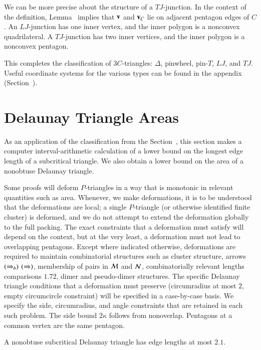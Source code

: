 We can be more precise about the structure of a $TJ$-junction.  In the
context of the definition, Lemma~ implies that ${\mathbf v}$
and ${\mathbf v}_C$ lie on adjacent pentagon edges of $C$.  An $LJ$-junction
has one inner vertex, and the inner polygon is a nonconvex quadrilateral.
A $TJ$-junction has two inner vertices, and the inner polygon is a
nonconvex pentagon.

This completes the classification of $3C$-triangles: $\Delta$,
pinwheel, pin-$T$, $LJ$, and $TJ$.  Useful coordinate systems for the
various types can be found in the appendix
(Section~).

\section{Delaunay Triangle Areas}

As an application of the classification from the
Section~, this section makes a computer interval-arithmetic
calculation of a lower bound on the longest edge length of a
subcritical triangle.  We also obtain a lower bound on the area of a
nonobtuse Delaunay triangle.

Some proofs will deform $P$-triangles in a way that is monotonic in
relevant quantities such as area.  Whenever, we make deformations, it
is to be understood that the deformations are local; a single
$P$-triangle (or otherwise identified finite cluster) is deformed, and
we do not attempt to extend the deformation globally to the full
packing. The exact constraints that a deformation must satisfy will
depend on the context, but at the very least, a deformation must not
lead to overlapping pentagons. Except where indicated otherwise,
deformations are required to maintain combinatorial structures such
as cluster structure, arrows $(\Rightarrow_{b})$ $(\Rightarrow)$, membership of pairs in
$\mathcal M$ and $\mathcal N$, combinatorially relevant lengths comparisons $1.72$,
dimer and pseudo-dimer structures.  The specific Delaunay triangle
conditions that a deformation must preserve (circumradius at most $2$,
empty circumcircle constraint) will be specified in a case-by-case
basis.  We specify the side, circumradius, and angle constraints that
are retained in each such problem.  The side bound $2\kappa$ follows
from nonoverlap.  Pentagons at a common vertex are the same pentagon.

\begin{lemma} 
  A nonobtuse subcritical Delaunay triangle has edge lengths at most $2.1$.
\end{lemma}

